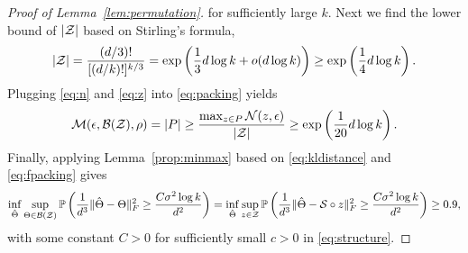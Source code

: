 \documentclass[12pt]{article}
\theoremstyle{definition}
\begin{document}
\begin{proof}[Proof of Lemma~\ref{lem:permutation}]
for sufficiently large $k$. Next we find the lower bound of $|\mathcal{Z}|$ based on Stirling's formula,
\begin{align}\label{eq:z}
    |\mathcal{Z}| = \frac{(d/3)!}{[(d/k)!]^{k/3}} = \exp\left(\frac{1}{3}d\log k + o(d\log k)\right)\geq\exp\left(\frac{1}{4}d\log k\right).
\end{align}
Plugging \eqref{eq:n} and \eqref{eq:z} into \eqref{eq:packing} yields
\begin{align}\label{eq:fpacking}
    \mathcal{M}(\epsilon,\mathcal{B}(\mathcal{Z}),\rho) = |P| \geq\frac{\max_{z\in P}\mathcal{N}(z,\epsilon)}{|\mathcal{Z}|}\geq\exp\left(\frac{1}{20}d\log k\right).
\end{align}
Finally, applying Lemma~\ref{prop:minmax} based on  \eqref{eq:kldistance} and \eqref{eq:fpacking} gives
\begin{align}
    \inf_{\hat\Theta}\sup_{\Theta\in\mathcal{B}(\mathcal{Z})}\mathbb{P}\left(\frac{1}{d^3}\lVert\hat\Theta-\Theta\rVert_F^2\geq \frac{C\sigma^2\log k}{d^2}\right)=\inf_{\hat\Theta}\sup_{z\in\mathcal{Z}}\mathbb{P}\left(\frac{1}{d^3}\lVert\hat\Theta-\mathcal{S}\circ z\rVert_F^2\geq \frac{C\sigma^2\log k}{d^2}\right)\geq 0.9,
\end{align}
with some constant $C>0$ for sufficiently small $c>0$ in \eqref{eq:structure}.
\end{proof}
\end{document}
